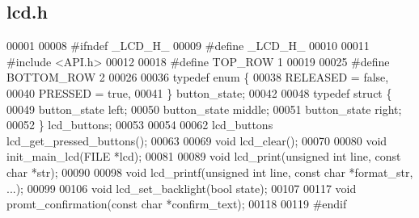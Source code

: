 \subsection{lcd.\+h}
\label{lcd_8h_source}

\begin{DoxyCode}
00001 
00008 \textcolor{preprocessor}{#ifndef \_LCD\_H\_}
00009 \textcolor{preprocessor}{#define \_LCD\_H\_}
00010 
00011 \textcolor{preprocessor}{#include <API.h>}
00012 
00018 \textcolor{preprocessor}{#define TOP\_ROW 1}
00019 
00025 \textcolor{preprocessor}{#define BOTTOM\_ROW 2}
00026 
00036 \textcolor{keyword}{typedef} \textcolor{keyword}{enum} \{
00038   RELEASED = \textcolor{keyword}{false},
00040   PRESSED = \textcolor{keyword}{true},
00041 \} button_state;
00042 
00048 \textcolor{keyword}{typedef} \textcolor{keyword}{struct }\{
00049   button_state left;
00050   button_state middle;
00051   button_state right;
00052 \} lcd_buttons;
00053 
00054 
00062 lcd_buttons lcd_get_pressed_buttons();
00063 
00069 \textcolor{keywordtype}{void} lcd_clear();
00070 
00080 \textcolor{keywordtype}{void} init_main_lcd(FILE *lcd);
00081 
00089 \textcolor{keywordtype}{void} lcd_print(\textcolor{keywordtype}{unsigned} \textcolor{keywordtype}{int} line, \textcolor{keyword}{const} \textcolor{keywordtype}{char} *str);
00090 
00098 \textcolor{keywordtype}{void} lcd_printf(\textcolor{keywordtype}{unsigned} \textcolor{keywordtype}{int} line, \textcolor{keyword}{const} \textcolor{keywordtype}{char} *format\_str, ...);
00099 
00106 \textcolor{keywordtype}{void} lcd_set_backlight(\textcolor{keywordtype}{bool} state);
00107 
00117 \textcolor{keywordtype}{void} promt_confirmation(\textcolor{keyword}{const} \textcolor{keywordtype}{char} *confirm\_text);
00118 
00119 \textcolor{preprocessor}{#endif}
\end{DoxyCode}
